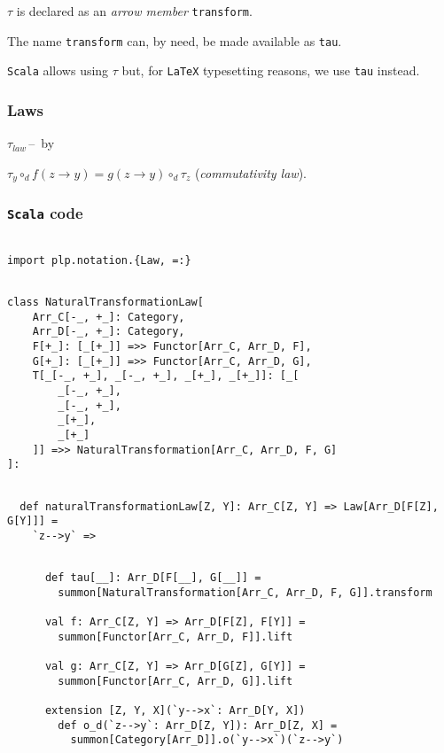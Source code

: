 \documentclass[11pt]{article}
\newcommand{\arrow}[2]{#1\!\!\rightarrow\!\!#2}
\newcommand{\code}{\subsubsection{{\tt Scala} code}\begingroup\rm \vspace{12pt}}
\newcommand{\laws}{\subsubsection{Laws}\begingroup\rm}
\def\edefn{\endgroup\par\pagebreak[2]\addvspace{\medskipamount}}
\let\elaws=\edefn
\newcounter{lister}
\newenvironment{labeledlist}[1]
{\begin{list}{{\rm#1\,--\,\arabic{lister}}}{\usecounter{lister}
\settowidth{\labelwidth}{#1--1}
\leftmargin\labelwidth \advance\leftmargin by \labelsep
}}
{\end{list}}
\def\blist#1{\begin{labeledlist}{#1}\setcounter{lister}{-1}}
\newcommand{\elist}{\end{labeledlist}}
\begin{document}
$\tau$ is declared as an {\em arrow member}
{\tt transform}.

The name {\tt transform} can, by need, be made available as {\tt tau}.

{\tt Scala} allows using $\tau$ but, for {\tt LaTeX} typesetting reasons, we use {\tt tau} instead.

\laws\label{natural transformation laws}
\blist{$\tau_{law}$}
\item $\tau_{y} \circ_{d} f(\arrow{z}{y}) = g(\arrow{z}{y}) \circ_{d} \tau_{z}$
      ({\em commutativity law}).
\elist
\elaws

\code
\begin{mdframed}[backgroundcolor=lightgray!20] 
\begin{lstlisting}

import plp.notation.{Law, =:}
\end{lstlisting}
\end{mdframed}
\vspace{6pt}
\begin{mdframed}[backgroundcolor=lightgray!20] 
\begin{lstlisting}

class NaturalTransformationLaw[
    Arr_C[-_, +_]: Category,
    Arr_D[-_, +_]: Category,
    F[+_]: [_[+_]] =>> Functor[Arr_C, Arr_D, F],
    G[+_]: [_[+_]] =>> Functor[Arr_C, Arr_D, G],
    T[_[-_, +_], _[-_, +_], _[+_], _[+_]]: [_[
        _[-_, +_],
        _[-_, +_],
        _[+_],
        _[+_]
    ]] =>> NaturalTransformation[Arr_C, Arr_D, F, G]
]:
\end{lstlisting}
\end{mdframed}
\vspace{6pt}
\begin{mdframed}[backgroundcolor=lightgray!20] 
\begin{lstlisting}

  def naturalTransformationLaw[Z, Y]: Arr_C[Z, Y] => Law[Arr_D[F[Z], G[Y]]] = 
    `z-->y` =>
\end{lstlisting}
\end{mdframed}
\vspace{6pt}
\clearpage
\begin{mdframed}[backgroundcolor=lightgray!20] 
\begin{lstlisting}

      def tau[__]: Arr_D[F[__], G[__]] =
        summon[NaturalTransformation[Arr_C, Arr_D, F, G]].transform

      val f: Arr_C[Z, Y] => Arr_D[F[Z], F[Y]] =
        summon[Functor[Arr_C, Arr_D, F]].lift

      val g: Arr_C[Z, Y] => Arr_D[G[Z], G[Y]] =
        summon[Functor[Arr_C, Arr_D, G]].lift

      extension [Z, Y, X](`y-->x`: Arr_D[Y, X])
        def o_d(`z-->y`: Arr_D[Z, Y]): Arr_D[Z, X] =
          summon[Category[Arr_D]].o(`y-->x`)(`z-->y`)      
\end{lstlisting}
\end{mdframed}
\end{document}
